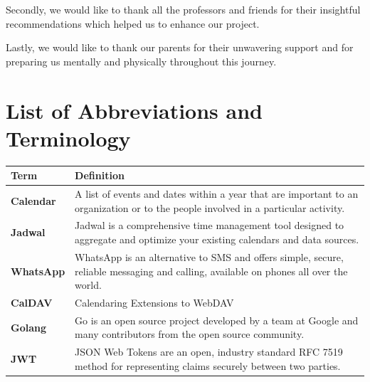 \documentclass[12pt,a4paper]{report}
\begin{document}
\begin{singlespace}
\begin{justify}
Secondly, we would like to thank all the professors and friends for their insightful recommendations which helped us to enhance our project.
    


Lastly, we would like to thank our parents for their unwavering support and for preparing us mentally and physically throughout this journey.
\end{justify}
    
\newpage

\tableofcontents

\newpage
\listoffigures


\newpage
\listoftables

\chapter*{List of Abbreviations and Terminology}

\begin{center}
    \begin{longtable}{p{}p{}}
    \toprule
    \textbf{Term} & \textbf{Definition} \\
    \midrule
    \endhead
    
    \textbf{Calendar} & A list of events and dates within a year that are important to an organization or to the people involved in a particular activity. \cite{def:calendar} \\[1ex]
    
    \textbf{Jadwal} & Jadwal is a comprehensive time management tool designed to aggregate and optimize your existing calendars and data sources. \\[1ex]
    
    \textbf{WhatsApp} & WhatsApp is an alternative to SMS and offers simple, secure, reliable messaging and calling, available on phones all over the world. \cite{whatsapp-about} \\[1ex]
    
    \textbf{CalDAV} & Calendaring Extensions to WebDAV \\[1ex]
    
    \textbf{Golang} & Go is an open source project developed by a team at Google and many contributors from the open source community. \cite{def:Golang}\\[1ex]
    
    \textbf{JWT} & JSON Web Tokens are an open, industry standard RFC 7519 method for representing claims securely between two parties. \cite{def:JWT}\\[1ex]
    

\end{longtable}
\end{center}
\end{singlespace}
\end{document}
